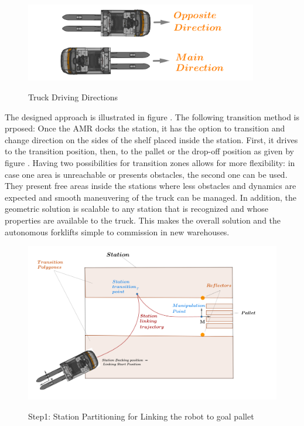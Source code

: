 \begin{figure}
    [!ht]
    \begin{center}
    \includegraphics[width=4in]{images/Chap2/driving_directions.png}\\
    \caption{Truck Driving Directions}
    \label{driving directions}
    \end{center}
\end{figure} 
 
The designed approach is illustrated in figure .
The following transition method is prposed: 
Once the AMR docks the station, it has the option to transition and change 
direction on the sides of the shelf placed inside the station. First, it drives to the transition position, then, to the 
pallet or the drop-off position as given by figure . Having two possibilities for transition zones allows 
for more flexibility: 
in case one area is unreachable or presents obstacles, the second one can be used. They present free areas 
inside the stations where less obstacles and dynamics are expected and smooth maneuvering of the truck can be managed. 
In addition, the geometric solution is scalable to 
any station that is recognized and whose properties are available to the truck. This makes the overall solution and the 
autonomous forklifts simple to
commission in new warehouses.

\begin{figure}
    [!ht]
    \begin{center}
    \includegraphics[width=\linewidth]{images/Chap2/station-without-subpolygones (2).png}\\
    \caption{Step1: Station Partitioning for Linking the robot to goal pallet \cite{R28}}
    \label{subpolygons}
    \end{center}
\end{figure}

